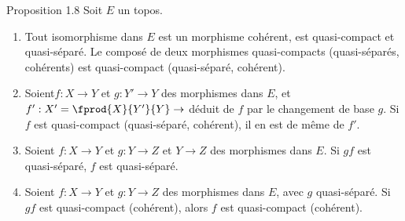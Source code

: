 \begin{enonce*}{Proposition 1.8}
Soit $E$ un topos.
\begin{enumerate}
\renewcommand{\theenumi}{\roman{enumi}}
\renewcommand{\labelenumi}{(\theenumi)}
\item Tout isomorphisme dans $E$ est un morphisme cohérent, \ie est
  quasi-compact et quasi-séparé. Le composé de deux morphismes
  quasi-compacts (\resp quasi-séparés, \resp cohérents) est
  quasi-compact (\resp quasi-séparé, \resp cohérent).

\item Soient\pageoriginale $f : X \to Y$ et $g : Y' \to Y$ des
  morphismes dans $E$,   et $f': X'= \fprod{X}{Y'}{Y} \to$ déduit de $f$ par le changement de
  base $g$. Si $f$ est quasi-compact (\resp quasi-séparé, \resp
  cohérent), il en est de même de $f'$.

\item Soient $f : X \to Y$ et $g : Y \to Z$ et $Y \to Z$ des
  morphismes dans $E$. Si $gf$ est quasi-séparé, $f$ est quasi-séparé.

\item Soient $f : X \to Y$ et $g : Y \to Z$ des morphismes dans $E$,
  avec $g$ quasi-séparé. Si $gf$ est quasi-compact (\resp cohérent),
  alors $f$ est quasi-compact (\resp cohérent).
\end{enumerate}
\end{enonce*}

